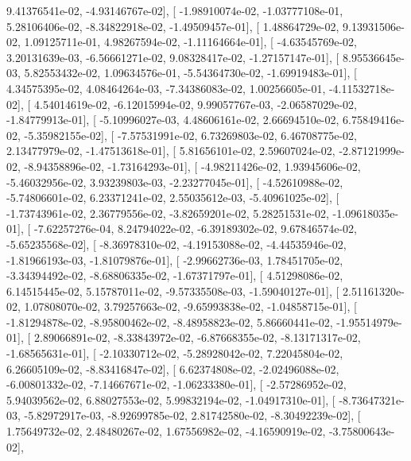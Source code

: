 \documentclass{article}
\begin{document}
          9.41376541e-02,  -4.93146767e-02],
       [ -1.98910074e-02,  -1.03777108e-01,   5.28106406e-02,
         -8.34822918e-02,  -1.49509457e-01],
       [  1.48864729e-02,   9.13931506e-02,   1.09125711e-01,
          4.98267594e-02,  -1.11164664e-01],
       [ -4.63545769e-02,   3.20131639e-03,  -6.56661271e-02,
          9.08328417e-02,  -1.27157147e-01],
       [  8.95536645e-03,   5.82553432e-02,   1.09634576e-01,
         -5.54364730e-02,  -1.69919483e-01],
       [  4.34575395e-02,   4.08464264e-03,  -7.34386083e-02,
          1.00256605e-01,  -4.11532718e-02],
       [  4.54014619e-02,  -6.12015994e-02,   9.99057767e-03,
         -2.06587029e-02,  -1.84779913e-01],
       [ -5.10996027e-03,   4.48606161e-02,   2.66694510e-02,
          6.75849416e-02,  -5.35982155e-02],
       [ -7.57531991e-02,   6.73269803e-02,   6.46708775e-02,
          2.13477979e-02,  -1.47513618e-01],
       [  5.81656101e-02,   2.59607024e-02,  -2.87121999e-02,
         -8.94358896e-02,  -1.73164293e-01],
       [ -4.98211426e-02,   1.93945606e-02,  -5.46032956e-02,
          3.93239803e-03,  -2.23277045e-01],
       [ -4.52610988e-02,  -5.74806601e-02,   6.23371241e-02,
          2.55035612e-03,  -5.40961025e-02],
       [ -1.73743961e-02,   2.36779556e-02,  -3.82659201e-02,
          5.28251531e-02,  -1.09618035e-01],
       [ -7.62257276e-04,   8.24794022e-02,  -6.39189302e-02,
          9.67846574e-02,  -5.65235568e-02],
       [ -8.36978310e-02,  -4.19153088e-02,  -4.44535946e-02,
         -1.81966193e-03,  -1.81079876e-01],
       [ -2.99662736e-03,   1.78451705e-02,  -3.34394492e-02,
         -8.68806335e-02,  -1.67371797e-01],
       [  4.51298086e-02,   6.14515445e-02,   5.15787011e-02,
         -9.57335508e-03,  -1.59040127e-01],
       [  2.51161320e-02,   1.07808070e-02,   3.79257663e-02,
         -9.65993838e-02,  -1.04858715e-01],
       [ -1.81294878e-02,  -8.95800462e-02,  -8.48958823e-02,
          5.86660441e-02,  -1.95514979e-01],
       [  2.89066891e-02,  -8.33843972e-02,  -6.87668355e-02,
         -8.13171317e-02,  -1.68565631e-01],
       [ -2.10330712e-02,  -5.28928042e-02,   7.22045804e-02,
          6.26605109e-02,  -8.83416847e-02],
       [  6.62374808e-02,  -2.02496088e-02,  -6.00801332e-02,
         -7.14667671e-02,  -1.06233380e-01],
       [ -2.57286952e-02,   5.94039562e-02,   6.88027553e-02,
          5.99832194e-02,  -1.04917310e-01],
       [ -8.73647321e-03,  -5.82972917e-03,  -8.92699785e-02,
          2.81742580e-02,  -8.30492239e-02],
       [  1.75649732e-02,   2.48480267e-02,   1.67556982e-02,
         -4.16590919e-02,  -3.75800643e-02],
\end{document}
